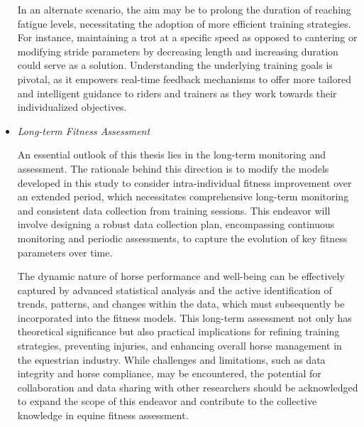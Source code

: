 \begin{itemize}[label={$\bullet$}, leftmargin=*]
In an alternate scenario, the aim may be to prolong the duration of reaching fatigue levels, necessitating the adoption of more efficient training strategies. For instance, maintaining a trot at a specific speed as opposed to cantering or modifying stride parameters by decreasing length and increasing duration could serve as a solution. Understanding the underlying training goals is pivotal, as it empowers real-time feedback mechanisms to offer more tailored and intelligent guidance to riders and trainers as they work towards their individualized objectives.


\item{\textit{Long-term Fitness Assessment}} %

An essential outlook of this thesis lies in the long-term monitoring and assessment. The rationale behind this direction is to modify the models developed in this study to consider intra-individual fitness improvement over an extended period, which necessitates comprehensive long-term monitoring and consistent data collection from training sessions. This endeavor will involve designing a robust data collection plan, encompassing continuous monitoring and periodic assessments, to capture the evolution of key fitness parameters over time. 

The dynamic nature of horse performance and well-being can be effectively captured by advanced statistical analysis and the active identification of trends, patterns, and changes within the data, which must subsequently be incorporated into the fitness models. This long-term assessment not only has theoretical significance but also practical implications for refining training strategies, preventing injuries, and enhancing overall horse management in the equestrian industry. While challenges and limitations, such as data integrity and horse compliance, may be encountered, the potential for collaboration and data sharing with other researchers should be acknowledged to expand the scope of this endeavor and contribute to the collective knowledge in equine fitness assessment.
\end{itemize}